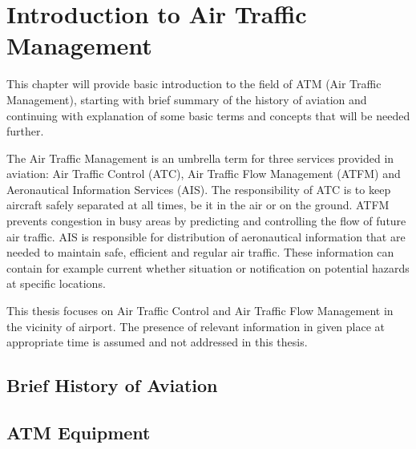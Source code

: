 \chapter{Introduction to Air Traffic Management}

This chapter will provide basic introduction to the field of ATM (Air Traffic Management), starting with brief summary of the history of aviation and continuing with explanation of some basic terms and concepts that will be needed further.

The Air Traffic Management is an umbrella term for three services provided in aviation: Air Traffic Control (ATC), Air Traffic Flow Management (ATFM) and Aeronautical Information Services (AIS). The responsibility of ATC is to keep aircraft safely separated at all times, be it in the air or on the ground. ATFM prevents congestion in busy areas by predicting and controlling the flow of future air traffic. AIS is responsible for distribution of aeronautical information that are needed to maintain safe, efficient and regular air traffic. These information can contain for example current whether situation or notification on potential hazards at specific locations. \cite{atm}

This thesis focuses on Air Traffic Control and Air Traffic Flow Management in the vicinity of airport. The presence of relevant information in given place at appropriate time is assumed and not addressed in this thesis.

\section{Brief History of Aviation}
\cite{nolan}

\section{ATM Equipment}









